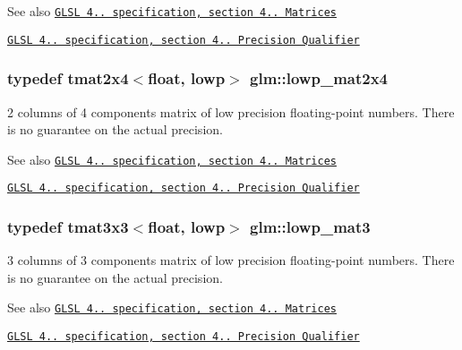 \begin{DoxySeeAlso}{See also}
\href{http://www.opengl.org/registry/doc/GLSLangSpec.4.20.8.pdf}{\tt G\+L\+S\+L 4.. specification, section 4.. Matrices} 

\href{http://www.opengl.org/registry/doc/GLSLangSpec.4.20.8.pdf}{\tt G\+L\+S\+L 4.. specification, section 4.. Precision Qualifier} 
\end{DoxySeeAlso}
\hypertarget{namespaceglm_adf454172b6c1e1288d7d003316b55c01}{}
\subsubsection[{lowp\+\_\+mat2x4}]{\setlength{\rightskip}{0pt plus 5cm}typedef tmat2x4$<$float, lowp$>$ {\bf glm\+::lowp\+\_\+mat2x4}}\label{namespaceglm_adf454172b6c1e1288d7d003316b55c01}
2 columns of 4 components matrix of low precision floating-\/point numbers. There is no guarantee on the actual precision.

\begin{DoxySeeAlso}{See also}
\href{http://www.opengl.org/registry/doc/GLSLangSpec.4.20.8.pdf}{\tt G\+L\+S\+L 4.. specification, section 4.. Matrices} 

\href{http://www.opengl.org/registry/doc/GLSLangSpec.4.20.8.pdf}{\tt G\+L\+S\+L 4.. specification, section 4.. Precision Qualifier} 
\end{DoxySeeAlso}
\hypertarget{namespaceglm_aa444aaad071ddcf85b8c490b143e9957}{}
\subsubsection[{lowp\+\_\+mat3}]{\setlength{\rightskip}{0pt plus 5cm}typedef tmat3x3$<$float, lowp$>$ {\bf glm\+::lowp\+\_\+mat3}}\label{namespaceglm_aa444aaad071ddcf85b8c490b143e9957}
3 columns of 3 components matrix of low precision floating-\/point numbers. There is no guarantee on the actual precision.

\begin{DoxySeeAlso}{See also}
\href{http://www.opengl.org/registry/doc/GLSLangSpec.4.20.8.pdf}{\tt G\+L\+S\+L 4.. specification, section 4.. Matrices} 

\href{http://www.opengl.org/registry/doc/GLSLangSpec.4.20.8.pdf}{\tt G\+L\+S\+L 4.. specification, section 4.. Precision Qualifier} 
\end{DoxySeeAlso}
\hypertarget{namespaceglm_adeaba732d325eca39068acf99c877b05}{}
